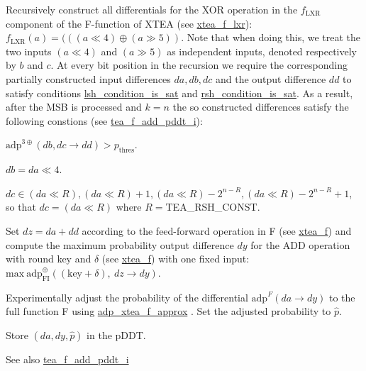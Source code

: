\begin{DoxyEnumerate}
\item \-Recursively construct all differentials for the \-X\-O\-R operation in the $f_{\mathrm{LXR}}$ component of the \-F-\/function of \-X\-T\-E\-A (see \hyperlink{xtea_8hh_a54a13074da03742ac10ea2ea5f7eec0e}{xtea\-\_\-f\-\_\-lxr})\-: $ f_{\mathrm{LXR}}(a) = (((a \ll 4) \oplus (a \gg 5)) $. \-Note that when doing this, we treat the two inputs $(a \ll 4)$ and $(a \gg 5)$ as independent inputs, denoted respectively by $b$ and $c$. \-At every bit position in the recursion we require the corresponding partially constructed input differences $da,db,dc$ and the output difference $dd$ to satisfy conditions \hyperlink{tea-f-add-pddt_8hh_a55f531edb6fd0ce85c20b47e890475e3}{lsh\-\_\-condition\-\_\-is\-\_\-sat} and \hyperlink{tea-f-add-pddt_8hh_a9a9b0ca87b727a966ffb1842ffa389e3}{rsh\-\_\-condition\-\_\-is\-\_\-sat}. \-As a result, after the \-M\-S\-B is processed and $k = n$ the so constructed differences satisfy the following constions (see \hyperlink{tea-f-add-pddt_8hh_ae8e09fe95cc3eb4257b868d91f8924ec}{tea\-\_\-f\-\_\-add\-\_\-pddt\-\_\-i})\-:
\begin{DoxyEnumerate}
\item $\mathrm{adp}^{3\oplus}(db, dc \rightarrow dd) > p_\mathrm{thres}$.
\item $db = da \ll 4$.
\item $dc \in {(da \ll R), (da \ll R) + 1, (da \ll R) - 2^{n-R}, (da \ll R) - 2^{n-R} + 1}$, so that $dc = (da \ll R)$ where $R =$\-T\-E\-A\-\_\-\-R\-S\-H\-\_\-\-C\-O\-N\-S\-T.
\end{DoxyEnumerate}
\item \-Set $dz = da + dd$ according to the feed-\/forward operation in \-F (see \hyperlink{xtea_8hh_a6c0b7a7bc47458fb343e66188fe4abda}{xtea\-\_\-f}) and compute the maximum probability output difference $dy$ for the \-A\-D\-D operation with round key and $\delta$ (see \hyperlink{xtea_8hh_a6c0b7a7bc47458fb343e66188fe4abda}{xtea\-\_\-f}) with one fixed input\-: $\mathrm{max}~\mathrm{adp}^{\oplus}_{\mathrm{FI}}((\mathrm{key} + \delta),~dz \rightarrow dy)$.
\item \-Experimentally adjust the probability of the differential $\mathrm{adp}^{F}(da \rightarrow dy)$ to the full function \-F using \hyperlink{adp-xtea-f-fk_8hh_a07bf299450a988931eb46ec5cca05150}{adp\-\_\-xtea\-\_\-f\-\_\-approx} . \-Set the adjusted probability to $\hat{p}$.
\item \-Store $(da, dy, \hat{p})$ in the p\-D\-D\-T.
\end{DoxyEnumerate}

\begin{DoxySeeAlso}{\-See also}
\hyperlink{tea-f-add-pddt_8hh_ae8e09fe95cc3eb4257b868d91f8924ec}{tea\-\_\-f\-\_\-add\-\_\-pddt\-\_\-i} 
\end{DoxySeeAlso}
